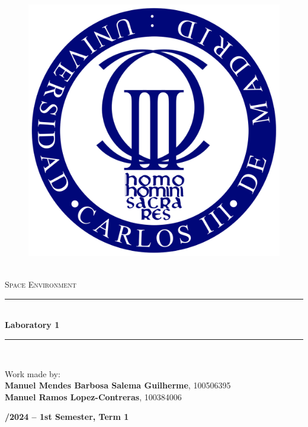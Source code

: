 \documentclass[10pt]{article}
\newcommand{\HRule}{\rule{\linewidth}{0.5mm}} %
\begin{document}
\begin{center}
    \begin{figure}
        \vspace{-1.0cm}
        \includegraphics[scale = 0.1, center]{Images/Logo_UC3M.svg.png} %
    \end{figure}
    \mbox{}\\[2.0cm]
    \textsc{\Huge Space Environment}\\[2.5cm]
    \HRule\\[0.4cm]
    {\large \bf {\selectfont Laboratory 1} \\[0.2cm]}
    \HRule
    \\[1.5cm]
\end{center}


\begin{center}

    \begin{flushleft}
        Work made by:\\[0.3cm] 
        \textbf{Manuel Mendes Barbosa Salema Guilherme}, 100506395\\ 
        \textbf{Manuel Ramos Lopez-Contreras}, 100384006\\[6.0cm]
    \end{flushleft}
\end{center}
\begin{flushleft}
\end{flushleft}
\begin{center}
    \large \bf {}/2024 -- 1st Semester, Term 1
\end{center}
\end{document}
